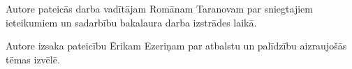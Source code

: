 ﻿Autore pateicās darba vadītājam Romānam Taranovam par sniegtajiem ieteikumiem un sadarbību bakalaura darba izstrādes laikā.

Autore izsaka pateicību Ērikam Ezeriņam par atbalstu un  palīdzību aizraujošās tēmas izvēlē.